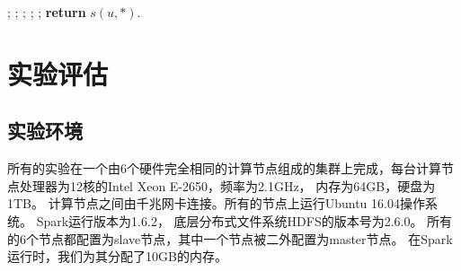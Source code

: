 \documentclass[master]{njuthesis}
\begin{document}
\begin{algorithm}[H]
\label{algo:match}
\begin{algorithmic}[1]
	;
	;
	;
	;
	\State {\qquad $\})$}
	;
	\State \textbf{return} $s(u, *)$.
\EndProcedure
\end{algorithmic}
\end{algorithm}


\section{实验评估}
\subsection{实验环境}
所有的实验在一个由6个硬件完全相同的计算节点组成的集群上完成，每台计算节点处理器为12核的Intel Xeon E-2650，频率为2.1GHz，
内存为64GB，硬盘为1TB。 计算节点之间由千兆网卡连接。所有的节点上运行Ubuntu 16.04操作系统。 
Spark运行版本为1.6.2， 底层分布式文件系统HDFS的版本号为2.6.0。
所有的6个节点都配置为slave节点，其中一个节点被二外配置为master节点。 
在Spark运行时，我们为其分配了10GB的内存。
\end{document}
